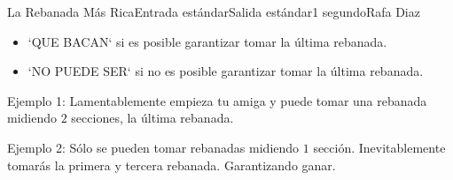 \begin{problem}{La Rebanada Más Rica}{Entrada estándar}{Salida estándar}{1 segundo}{}{Rafa Diaz}
\OutputFile
\begin{itemize}
    \item `QUE BACAN` si es posible garantizar tomar la última rebanada.
    \item `NO PUEDE SER` si no es posible garantizar tomar la última rebanada.
\end{itemize}


\Example

\begin{example}


\end{example}



Ejemplo 1: Lamentablemente empieza tu amiga y puede tomar una rebanada midiendo $2$ secciones, la última rebanada.

Ejemplo 2: Sólo se pueden tomar rebanadas midiendo $1$ sección. Inevitablemente tomarás la primera y tercera rebanada. Garantizando ganar.

\end{problem}


